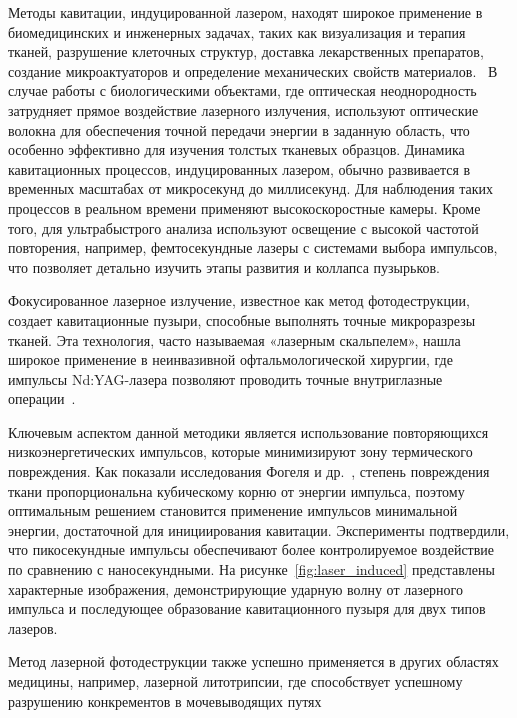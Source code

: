 Методы кавитации, индуцированной лазером, находят широкое применение в биомедицинских и инженерных задачах, таких как визуализация и терапия тканей, разрушение клеточных структур, доставка лекарственных препаратов, создание микроактуаторов и определение механических свойств материалов.~\cite{10.1364/ol.39.002599, 10.1063/1.3430989}
В случае работы с биологическими объектами, где оптическая неоднородность затрудняет прямое воздействие лазерного излучения, используют оптические волокна для обеспечения точной передачи энергии в заданную область, что особенно эффективно для изучения толстых тканевых образцов.
Динамика кавитационных процессов, индуцированных лазером, обычно развивается в временных масштабах от микросекунд до миллисекунд. Для наблюдения таких процессов в реальном времени применяют высокоскоростные камеры. Кроме того, для ультрабыстрого анализа используют освещение с высокой частотой повторения, например, фемтосекундные лазеры с системами выбора импульсов, что позволяет детально изучить этапы развития и коллапса пузырьков.~\cite{10.1016/j.jmps.2017.12.006}

Фокусированное лазерное излучение, известное как метод фотодеструкции, создает кавитационные пузыри, способные выполнять точные микроразрезы тканей. Эта технология, часто называемая «лазерным скальпелем», нашла широкое применение в неинвазивной офтальмологической хирургии, где импульсы Nd:YAG-лазера позволяют проводить точные внутриглазные операции~\cite{10.1007/bf00130696,10.1016/s0146-2776(80)80036-x, 10.1017/s0022112089002314, 10.1121/1.415878}.

Ключевым аспектом данной методики является использование повторяющихся низкоэнергетических импульсов, которые минимизируют зону термического повреждения. 
Как показали исследования Фогеля и др.~\cite{10.1017/s0022112089002314, 10.1121/1.415878}, степень повреждения ткани пропорциональна кубическому корню от энергии импульса, поэтому оптимальным решением становится применение импульсов минимальной энергии, достаточной для инициирования кавитации. 
Эксперименты подтвердили, что пикосекундные импульсы обеспечивают более контролируемое воздействие по сравнению с наносекундными. На рисунке~\ref{fig:laser_induced} представлены характерные изображения, демонстрирующие ударную волну от лазерного импульса и последующее образование кавитационного пузыря для двух типов лазеров.

Метод лазерной фотодеструкции также успешно применяется в других областях медицины, например, лазерной литотрипсии, где способствует успешному разрушению конкрементов в мочевыводящих путях~\cite{10.1089/end.2012.0217, 10.1364/boe.9.004552}

